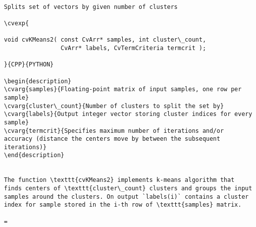 \begin{verbatim}

Splits set of vectors by given number of clusters

\cvexp{

void cvKMeans2( const CvArr* samples, int cluster\_count,
                CvArr* labels, CvTermCriteria termcrit );

}{CPP}{PYTHON}

\begin{description}
\cvarg{samples}{Floating-point matrix of input samples, one row per sample}
\cvarg{cluster\_count}{Number of clusters to split the set by}
\cvarg{labels}{Output integer vector storing cluster indices for every sample}
\cvarg{termcrit}{Specifies maximum number of iterations and/or accuracy (distance the centers move by between the subsequent iterations)}
\end{description}


The function \texttt{cvKMeans2} implements k-means algorithm that finds centers of \texttt{cluster\_count} clusters and groups the input samples around the clusters. On output `labels(i)` contains a cluster index for sample stored in the i-th row of \texttt{samples} matrix.

=\end{verbatim}
\label{Example. Clustering random samples of multi-gaussian distribution with k-means}
